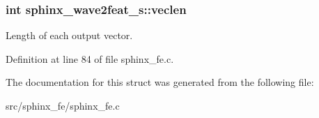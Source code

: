 \subsubsection[{veclen}]{\setlength{\rightskip}{0pt plus 5cm}int sphinx\+\_\+wave2feat\+\_\+s\+::veclen}\label{structsphinx__wave2feat__s_ad71e5fca7c13ae0258bcee81a6f1fa89}


Length of each output vector. 



Definition at line 84 of file sphinx\+\_\+fe.\+c.



The documentation for this struct was generated from the following file\+:\begin{DoxyCompactItemize}
\item 
src/sphinx\+\_\+fe/sphinx\+\_\+fe.\+c\end{DoxyCompactItemize}
